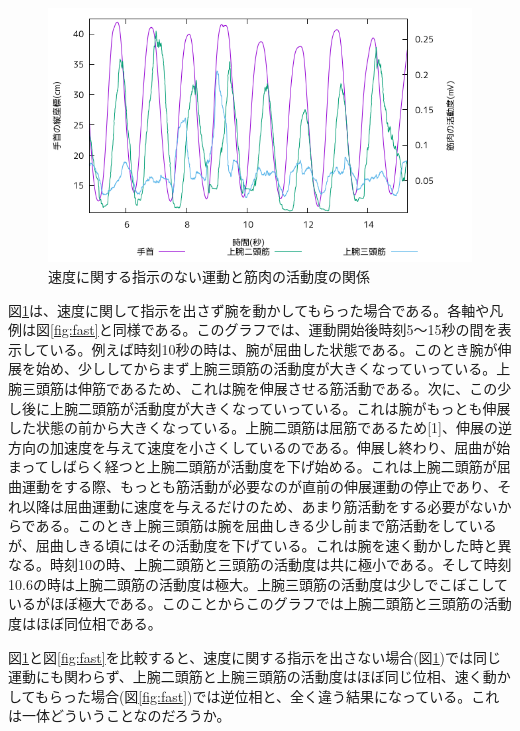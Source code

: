 \documentclass{jsarticle}
\begin{document}
\begin{figure}[b]
  \begin{center}
    \includegraphics[width=15cm]{images/s1proto.png}
  \end{center}
  \caption{速度に関する指示のない運動と筋肉の活動度の関係}
  \label{fig:slow}
\end{figure}
図\ref{fig:slow}は、速度に関して指示を出さず腕を動かしてもらった場合である。各軸や凡例は図\ref{fig:fast}と同様である。このグラフでは、運動開始後時刻5〜15秒の間を表示している。例えば時刻10秒の時は、腕が屈曲した状態である。このとき腕が伸展を始め、少ししてからまず上腕三頭筋の活動度が大きくなっていっている。上腕三頭筋は伸筋であるため、これは腕を伸展させる筋活動である。次に、この少し後に上腕二頭筋が活動度が大きくなっていっている。これは腕がもっとも伸展した状態の前から大きくなっている。上腕二頭筋は屈筋であるため[1]、伸展の逆方向の加速度を与えて速度を小さくしているのである。伸展し終わり、屈曲が始まってしばらく経つと上腕二頭筋が活動度を下げ始める。これは上腕二頭筋が屈曲運動をする際、もっとも筋活動が必要なのが直前の伸展運動の停止であり、それ以降は屈曲運動に速度を与えるだけのため、あまり筋活動をする必要がないからである。このとき上腕三頭筋は腕を屈曲しきる少し前まで筋活動をしているが、屈曲しきる頃にはその活動度を下げている。これは腕を速く動かした時と異なる。時刻10の時、上腕二頭筋と三頭筋の活動度は共に極小である。そして時刻10.6の時は上腕二頭筋の活動度は極大。上腕三頭筋の活動度は少しでこぼこしているがほぼ極大である。このことからこのグラフでは上腕二頭筋と三頭筋の活動度はほぼ同位相である。

図\ref{fig:slow}と図\ref{fig:fast}を比較すると、速度に関する指示を出さない場合(図\ref{fig:slow})では同じ運動にも関わらず、上腕二頭筋と上腕三頭筋の活動度はほぼ同じ位相、速く動かしてもらった場合(図\ref{fig:fast})では逆位相と、全く違う結果になっている。これは一体どういうことなのだろうか。
\end{document}
